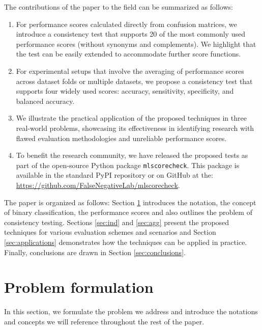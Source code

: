 \documentclass[5p, final]{elsarticle}
\begin{document}
The contributions of the paper to the field can be summarized as follows:
\begin{enumerate}
\item For performance scores calculated directly from confusion matrices, we introduce a consistency test that supports 20 of the most commonly used performance scores (without synonyms and complements). We highlight that the test can be easily extended to accommodate further score functions.
\item For experimental setups that involve the averaging of performance scores across dataset folds or multiple datasets, we propose a consistency test that supports four widely used scores: accuracy, sensitivity, specificity, and balanced accuracy.
\item We illustrate the practical application of the proposed techniques in three real-world problems, showcasing its effectiveness in identifying research with flawed evaluation methodologies and unreliable performance scores.
\item To benefit the research community, we have released the proposed tests as part of the open-source Python package \verb|mlscorecheck|. This package is available in the standard PyPI repository or on GitHub at the: \url{https://github.com/FalseNegativeLab/mlscorecheck}.
\end{enumerate}

The paper is organized as follows: Section \ref{sec:problem} introduces the notation, the concept of binary classification, the performance scores and also outlines the problem of consistency testing. Sections \ref{sec:ind} and \ref{sec:agg} present the proposed techniques for various evaluation schemes and scenarios and Section \ref{sec:applications} demonstrates how the techniques can be applied in practice. Finally, conclusions are drawn in Section \ref{sec:conclusions}.

\section{Problem formulation}
\label{sec:problem}

In this section, we formulate the problem we address and introduce the notations and concepts we will reference throughout the rest of the paper.
\end{document}
